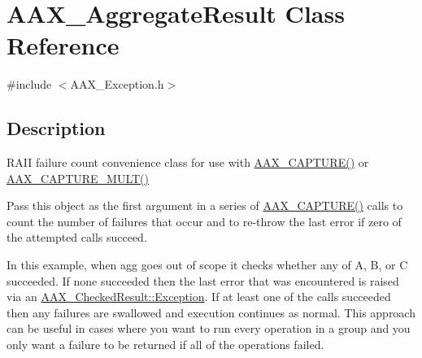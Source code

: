 \hypertarget{a01605}{}\section{A\+A\+X\+\_\+\+Aggregate\+Result Class Reference}
\label{a01605}


{\ttfamily \#include $<$A\+A\+X\+\_\+\+Exception.\+h$>$}



\subsection{Description}
R\+A\+II failure count convenience class for use with \mbox{\hyperlink{a00497_af9972551e4546e894010f99eade68c94}{A\+A\+X\+\_\+\+C\+A\+P\+T\+U\+R\+E()}} or \mbox{\hyperlink{a00497_a078be92d3d19a5a4b3da2b55ae5ac1c9}{A\+A\+X\+\_\+\+C\+A\+P\+T\+U\+R\+E\+\_\+\+M\+U\+L\+T()}}

Pass this object as the first argument in a series of \mbox{\hyperlink{a00497_af9972551e4546e894010f99eade68c94}{A\+A\+X\+\_\+\+C\+A\+P\+T\+U\+R\+E()}} calls to count the number of failures that occur and to re-\/throw the last error if zero of the attempted calls succeed.


\begin{DoxyCode}{0}
\DoxyCodeLine{\textcolor{comment}{// example A: throw if all operations fail}}
\end{DoxyCode}


In this example, when {\ttfamily agg} goes out of scope it checks whether any of A, B, or C succeeded. If none succeeded then the last error that was encountered is raised via an \mbox{\hyperlink{a01601_a36fd71afc6d62993c1dd96e1ca9fcc0e}{A\+A\+X\+\_\+\+Checked\+Result\+::\+Exception}}. If at least one of the calls succeeded then any failures are swallowed and execution continues as normal. This approach can be useful in cases where you want to run every operation in a group and you only want a failure to be returned if all of the operations failed.


\begin{DoxyCode}{0}
\DoxyCodeLine{\textcolor{comment}{// example B: throw if any operation fails}}
\end{DoxyCode}


